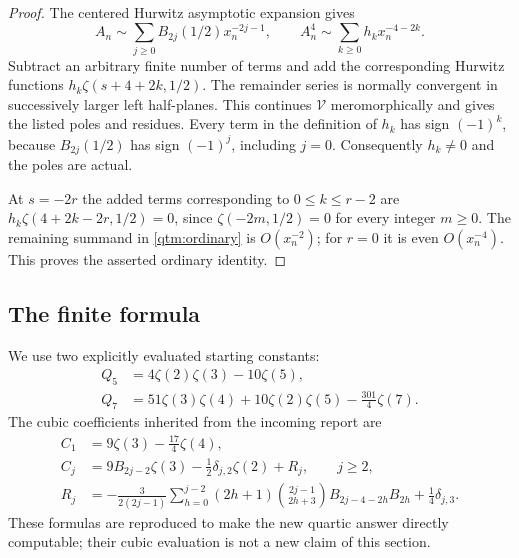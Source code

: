 \begin{proof}
The centered Hurwitz asymptotic expansion gives
\[
 A_n\sim\sum_{j\ge0}B_{2j}(1/2)x_n^{-2j-1},\qquad
 A_n^4\sim\sum_{k\ge0}h_kx_n^{-4-2k}.
\]
Subtract an arbitrary finite number of terms and add the corresponding
Hurwitz functions $h_k\zeta(s+4+2k,1/2)$.  The remainder series is
normally convergent in successively larger left half-planes.  This
continues $\mathcal V$ meromorphically and gives the listed poles and
residues.  Every term in the definition of $h_k$ has sign $(-1)^k$,
because $B_{2j}(1/2)$ has sign $(-1)^j$, including $j=0$.
Consequently $h_k\ne0$ and the poles are actual.

At $s=-2r$ the added terms corresponding to $0\le k\le r-2$
are $h_k\zeta(4+2k-2r,1/2)=0$, since
$\zeta(-2m,1/2)=0$ for every integer $m\ge0$.  The remaining
summand in \eqref{qtm:ordinary} is $O(x_n^{-2})$; for $r=0$ it
is even $O(x_n^{-4})$.  This proves the asserted ordinary identity.
\end{proof}

\subsection{The finite formula}

We use two explicitly evaluated starting constants:
\begin{align}
 Q_5&=4\zeta(2)\zeta(3)-10\zeta(5),\label{qtm:Q5}\\
 Q_7&=51\zeta(3)\zeta(4)+10\zeta(2)\zeta(5)
                  -\frac{301}{4}\zeta(7).\label{qtm:Q7}
\end{align}
The cubic coefficients inherited from the incoming report are
\begin{align}
 C_1&=9\zeta(3)-\frac{17}{4}\zeta(4),\label{qtm:C1}\\
 C_j&=9B_{2j-2}\zeta(3)-\frac12\delta_{j,2}\zeta(2)
       +R_j,\qquad j\ge2,\label{qtm:Cj}\\
 R_j&=-\frac{3}{2(2j-1)}
 \sum_{h=0}^{j-2}(2h+1)\binom{2j-1}{2h+3}
 B_{2j-4-2h}B_{2h}+\frac14\delta_{j,3}.
 \label{qtm:Rj}
\end{align}
These formulas are reproduced to make the new quartic answer directly
computable; their cubic evaluation is not a new claim of this section.

